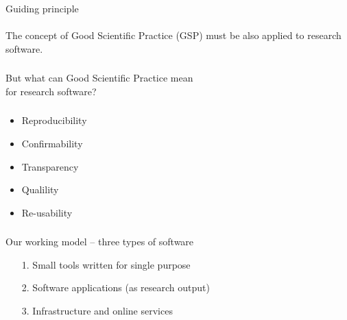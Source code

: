 \documentclass{beamer}
\begin{document}
\begin{frame}
  \frametitle{}
  \begin{block}{}
    \begin{center}
      Guiding principle\\\ \\
    The concept of Good Scientific Practice (GSP) must be also applied
    to research software.
    \end{center}
  \end{block}
\end{frame}

\begin{frame}
  \frametitle{}
  \begin{block}{}
    \begin{center}    
      But what can Good Scientific Practice mean\\ for research software?
      \end{center}       
  \end{block}
\end{frame}

\begin{frame}
  \frametitle{}
  \begin{block}{}
    \begin{center}
        \begin{itemize}
        \item Reproducibility
        \item Confirmability          
        \item Transparency
        \item Qualility
        \item Re-usability
        \end{itemize}
      \end{center}       
  \end{block}
\end{frame}

\begin{frame}
  \frametitle{}
  \begin{block}{}
    \begin{center}
      Our working model -- three types of software\\
      \begin{itemize}
      \item[1.] Small tools written for single purpose
      \item[2.] Software applications (as research output)
      \item[3.] Infrastructure and online services
      \end{itemize}
    \end{center}
  \end{block}
\end{frame}
\end{document}
